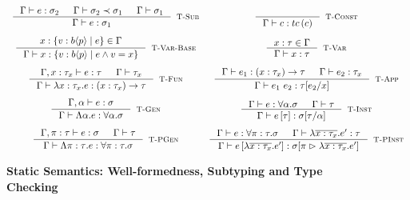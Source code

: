 \begin{figure}[ht!]
\medskip {}

$$\begin{array}{cc}

\inference
  {  \hastype{\Gamma}{e}{\sigma_2} && \isSubType{\Gamma}{\sigma_2}{\sigma_1} 
  && \isWellFormed{\Gamma}{\sigma_1}
  }
  {\hastype{\Gamma}{e}{\sigma_1}}
  [\tsub]
&

\inference
  {}
  {\hastype{\Gamma}{c}{\tc{c}}}
  [\tconst]


\\[0.2in]

\inference
  {x: \tpref{b}{\areft}{\reft} \in \Gamma}
  {\hastype{\Gamma}{x}{\tpref{b}{\areft}{e \land \vref = x}}}
  [\tbase]

&

\inference
  {x:\tau \in \Gamma}
  {\hastype{\Gamma}{x}{\tau}} 
  [\tvariable]

\\[0.2in]

\inference
   {\hastype{\Gamma, x:\tau_x}{e}{\tau} 
    && \isWellFormed{\Gamma}{\tau_x}
   }
   {\hastype{\Gamma}{\efunt{x}{\tau_x}{e}}{\tfun{x}{\tau_x}{\tau}}}
   [\tfunction]

& 

\label{tapp}
\inference
   {\hastype{\Gamma}{e_1}{\tfun{x}{\tau_x}{\tau}} 
   &&  \hastype{\Gamma}{e_2}{\tau_x}
   }
   {\hastype{\Gamma}{\eapp{e_1}{e_2}}{\SUBST{\tau}{x}{e_2}}}
   [\tapp]

\\[0.2in]

\inference
  {\hastype{\Gamma, \alpha}{e}{\sigma}}
  {\hastype{\Gamma}{\etabs{\alpha}{e}}{\ttabs{\alpha}{\sigma}}}
  [\tgen]

&  
\inference
  {\hastype{\Gamma}{e}{\ttabs{\alpha}{\sigma}} && 
   \isWellFormed{\Gamma}{\tau}
  }
  {\hastype{\Gamma}{\etapp{e}{\tau}}{\SUBST{\sigma}{\alpha}{\tau}}}
  [\tinst]

\\[0.2in]

\inference
    {\hastype{\Gamma, \rvar:\tau}{e}{\sigma} &&
     \isWellFormed{\Gamma}{\tau} 
    }
    {\hastype{\Gamma}{\epabs{\rvar}{\tau}{e}}{\tpabs{\rvar}{\tau}{\sigma}}}
    [\tpgen]
&  

\inference
    {\hastype{\Gamma}{e}{\tpabs{\rvar}{\tau}{\sigma}} && 
     \hastype{\Gamma}{\efunbar{x:\tau_x}{\reft'}}{\tau}
    }
    {\hastype{\Gamma}
             {\epapp{e}{\efunbar{x:\tau_x}{\reft'}}}
             {\rpinst{\sigma}{\rvar}{\efunbar{x:\tau_x}{\reft'}}}
    }
    [\tpinst]
\end{array}$$
\caption{\textbf{Static Semantics: Well-formedness, Subtyping and Type Checking}}
\label{fig:rules}
\end{figure}

